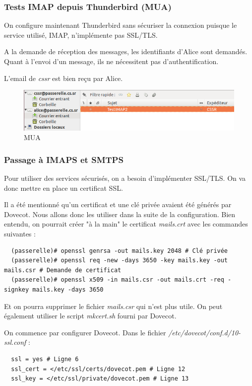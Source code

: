\documentclass[a4paper]{article}
\begin{document}
\subsubsection{Tests IMAP depuis Thunderbird (MUA)}

On configure maintenant Thunderbird sans sécuriser la connexion
puisque le service utilisé, IMAP, n'implémente pas SSL/TLS.

A la demande de réception des messages, les identifiants
d'Alice sont demandés. Quant à l'envoi d'un message, ils ne 
nécessitent pas d'authentification.

L'email de \textit{cssr} est bien reçu par Alice.

\begin{figure}[!ht]
	\centering
	\includegraphics[scale=.7]{Thunderbird.PNG}
	\caption{\label{mua} MUA}
\end{figure}

\subsubsection{Passage à IMAPS et SMTPS}

Pour utiliser des services sécurisés, on a besoin d'implémenter SSL/TLS.
On va donc mettre en place un certificat SSL.

Il a été mentionné qu'un certificat et une clé privée avaient été générés
par Dovecot. Nous allons donc les utiliser dans la suite de la configuration.
Bien entendu, on pourrait créer "à la main" le certificat \textit{mails.crt} avec les commandes
suivantes :
\begin{verbatim}
  (passerelle)# openssl genrsa -out mails.key 2048 # Clé privée
  (passerelle)# openssl req -new -days 3650 -key mails.key -out mails.csr # Demande de certificat
  (passerelle)# openssl x509 -in mails.csr -out mails.crt -req -signkey mails.key -days 3650 
\end{verbatim}
Et on pourra supprimer le fichier \textit{mails.csr} qui n'est plus utile.
On peut également utiliser le script \textit{mkcert.sh} fourni par Dovecot.

On commence par configurer Dovecot. Dans le fichier \textit{/etc/dovecot/conf.d/10-ssl.conf} :
\begin{verbatim}
  ssl = yes # Ligne 6
  ssl_cert = </etc/ssl/certs/dovecot.pem # Ligne 12
  ssl_key = </etc/ssl/private/dovecot.pem # Ligne 13
\end{verbatim}
\end{document}

